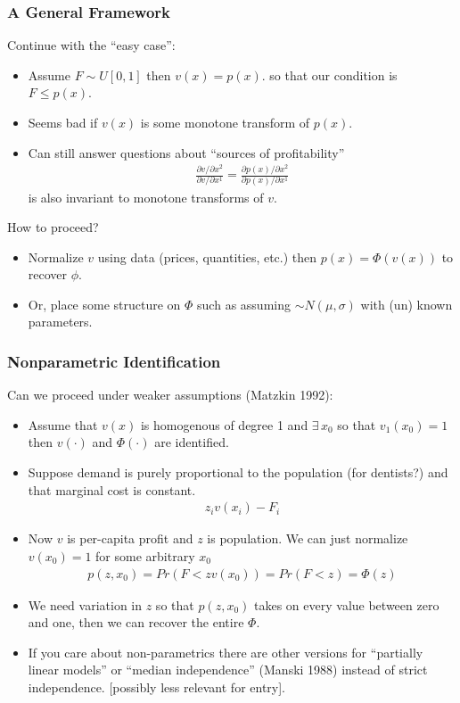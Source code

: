 \documentclass[xcolor=pdftex,dvipsnames,table,mathserif]{beamer}
\begin{document}
\begin{frame}
\frametitle{A General Framework}
Continue with the ``easy case'':
\begin{itemize}
\item Assume $F \sim U[0,1]$ then $v(x) = p(x)$. so that our condition is $F \leq p(x)$.
\item Seems bad if $v(x)$ is some monotone transform of $p(x)$.
\item Can still answer questions about ``sources of profitability''
\begin{eqnarray*}
\frac{\partial v/ \partial x^2}{\partial v/ \partial x^1} = \frac{\partial p(x) / \partial x^2}{\partial p(x)/ \partial x^1}
\end{eqnarray*}
is also invariant to monotone transforms of $v$.
\end{itemize}
How to proceed?
\begin{itemize}
\item Normalize $v$ using data (prices, quantities, etc.) then $p(x) = \Phi(v(x))$ to recover $\phi$.
\item Or, place some structure on $\Phi$ such as assuming $\sim N(\mu,\sigma)$ with (un) known parameters.
\end{itemize}
\end{frame}

\begin{frame}
\frametitle{Nonparametric Identification}
\small
Can we proceed under weaker assumptions (Matzkin 1992):
\begin{itemize}
\item Assume that $v(x)$ is homogenous of degree 1 and $\exists\, x_0$ so that $v_1(x_0) =1$ then $v(\cdot)$ and $\Phi(\cdot)$ are identified.
\item Suppose demand is purely proportional to the population (for dentists?) and that marginal cost is constant.
\begin{eqnarray*}
z_i v(x_i) - F_i
\end{eqnarray*}
\item Now $v$ is per-capita profit and $z$ is population. We can just normalize $v(x_0)=1$ for some arbitrary $x_0$
\begin{eqnarray*}
p(z,x_0) = Pr(F < z v(x_0)) = Pr( F < z) = \Phi(z)
\end{eqnarray*}
\item We need variation in $z$ so that $p(z,x_0)$ takes on every value between zero and one, then we can recover the entire $\Phi$.
\item If you care about non-parametrics there are other versions for ``partially linear models'' or ``median independence'' (Manski 1988) instead of strict independence. [possibly less relevant for entry].
\end{itemize}
\end{frame}
\end{document}
